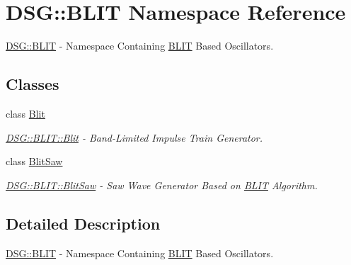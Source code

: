 \hypertarget{namespace_d_s_g_1_1_b_l_i_t}{\section{D\+S\+G\+:\+:B\+L\+I\+T Namespace Reference}
\label{namespace_d_s_g_1_1_b_l_i_t}
}


\hyperlink{namespace_d_s_g_1_1_b_l_i_t}{D\+S\+G\+::\+B\+L\+I\+T} -\/ Namespace Containing \hyperlink{namespace_d_s_g_1_1_b_l_i_t}{B\+L\+I\+T} Based Oscillators.  


\subsection*{Classes}
\begin{DoxyCompactItemize}
\item 
class \hyperlink{class_d_s_g_1_1_b_l_i_t_1_1_blit}{Blit}
\begin{DoxyCompactList}\small\item\em \hyperlink{class_d_s_g_1_1_b_l_i_t_1_1_blit}{D\+S\+G\+::\+B\+L\+I\+T\+::\+Blit} -\/ Band-\/\+Limited Impulse Train Generator. \end{DoxyCompactList}\item 
class \hyperlink{class_d_s_g_1_1_b_l_i_t_1_1_blit_saw}{Blit\+Saw}
\begin{DoxyCompactList}\small\item\em \hyperlink{class_d_s_g_1_1_b_l_i_t_1_1_blit_saw}{D\+S\+G\+::\+B\+L\+I\+T\+::\+Blit\+Saw} -\/ Saw Wave Generator Based on \hyperlink{namespace_d_s_g_1_1_b_l_i_t}{B\+L\+I\+T} Algorithm. \end{DoxyCompactList}\end{DoxyCompactItemize}


\subsection{Detailed Description}
\hyperlink{namespace_d_s_g_1_1_b_l_i_t}{D\+S\+G\+::\+B\+L\+I\+T} -\/ Namespace Containing \hyperlink{namespace_d_s_g_1_1_b_l_i_t}{B\+L\+I\+T} Based Oscillators. 